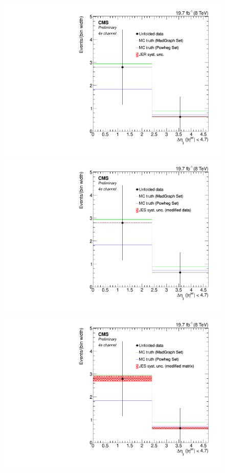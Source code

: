 \begin{figure}[hbtp]
\begin{center}
   \includegraphics[width=0.8\cmsFigWidth]{Figures/Unfolding/Systematics/ZZTo4e_Deta_JER_Mad_fr}
   \includegraphics[width=0.8\cmsFigWidth]{Figures/Unfolding/Systematics/ZZTo4e_Deta_JES_ModData_Mad_fr}     
   \includegraphics[width=0.8\cmsFigWidth]{Figures/Unfolding/Systematics/ZZTo4e_Deta_JES_ModMat_Mad_fr}

\end{center}
\end{figure}
